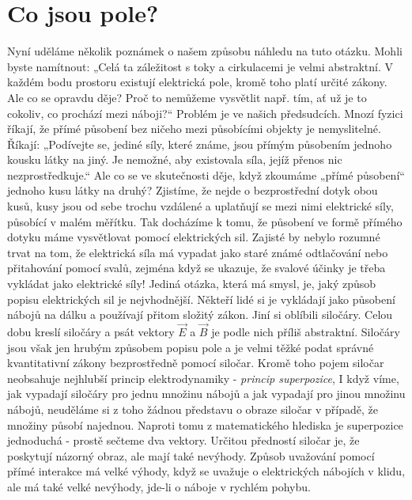   \section{Co jsou pole?}  
    Nyní uděláme několik poznámek o našem způsobu náhledu na tuto otázku. Mohli byste namítnout:
    „Celá ta záležitost s toky a cirkulacemi je velmi abstraktní. V každém bodu prostoru existují
    elektrická pole, kromě toho platí určité zákony. Ale co se opravdu děje? Proč to nemůžeme
    vysvětlit např. tím, ať už je to cokoliv, co prochází mezi náboji?“ Problém je ve našich
    předsudcích. Mnozí fyzici říkají, že přímé působení bez ničeho mezi působícími objekty je
    nemyslitelné. Říkají: „Podívejte se, jediné síly, které známe, jsou přímým působením jednoho
    kousku látky na jiný. Je nemožné, aby existovala síla, jejíž přenos nic nezprostředkuje.“ Ale co
    se ve skutečnosti děje, když zkoumáme „přímé působení“ jednoho kusu látky na druhý? Zjistíme, že
    nejde o bezprostřední dotyk obou kusů, kusy jsou od sebe trochu vzdálené a uplatňují se mezi
    nimi elektrické síly, působící v malém měřítku. Tak docházíme k tomu, že působení ve formě
    přímého dotyku máme vysvětlovat pomocí elektrických sil. Zajisté by nebylo rozumné trvat na tom,
    že elektrická síla má vypadat jako staré známé odtlačování nebo přitahování pomocí svalů,
    zejména když se ukazuje, že svalové účinky je třeba vykládat jako elektrické síly! Jediná
    otázka, která má smysl, je, jaký způsob popisu elektrických sil je nejvhodnější. Někteří lidé si
    je vykládají jako působení nábojů na dálku a používají přitom složitý zákon. Jiní si oblíbili
    siločáry. Celou dobu kreslí siločáry a psát vektory \(\vec{E}\) a \(\vec{B}\) je podle nich
    příliš abstraktní. Siločáry jsou však jen hrubým způsobem popisu pole a je velmi těžké podat
    správné kvantitativní zákony bezprostředně pomocí siločar. Kromě toho pojem siločar neobsahuje
    nejhlubší princip elektrodynamiky - \emph{princip superpozice}, I když víme, jak vypadají
    siločáry pro jednu množinu nábojů a jak vypadají pro jinou množinu nábojů, neuděláme si z toho
    žádnou představu o obraze siločar v případě, že množiny působí najednou. Naproti tomu z
    matematického hlediska je superpozice jednoduchá - prostě sečteme dva vektory. Určitou předností
    siločar je, že poskytují názorný obraz, ale mají také nevýhody. Způsob uvažování pomocí přímé
    interakce má velké výhody, když se uvažuje o elektrických nábojích v klidu, ale má také velké
    nevýhody, jde-li o náboje v rychlém pohybu.
    
